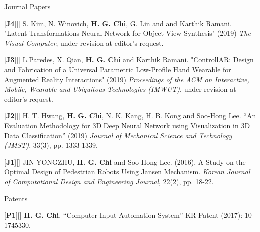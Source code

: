 \begin{cventries}
\cvpub
{Journal Papers} %
{ %
\begin{cvitems}
\item {[\textbf{J4}][\href{https://docs.google.com/viewer?url=https://github.com/stnoah1/CV/raw/master/documents/VisualComputer.pdf}{}] S. Kim, N. Winovich, \textbf{H. G. Chi}, G. Lin and and Karthik Ramani. "Latent Transformations Neural Network for Object View Synthesis" (2019) \textit{The Visual Computer}, under revision at editor's request.}
\item {[\textbf{J3}][\href{https://docs.google.com/viewer?url=https://github.com/stnoah1/CV/raw/master/documents/ControllAR.pdf}{}] L.Paredes, X. Qian, \textbf{H. G. Chi} and Karthik Ramani. "ControllAR: Design and Fabrication of a Universal Parametric Low-Profile Hand Wearable for Augmented Reality Interactions" (2019) \textit{Proceedings of the ACM on Interactive, Mobile, Wearable and Ubiquitous Technologies (IMWUT)}, under revision at editor's request.}
\item {[\textbf{J2}][\href{https://link.springer.com/content/pdf/10.1007/s12206-019-0233-1.pdf}{}] H. T. Hwang, \textbf{H. G. Chi}, N. K. Kang, H. B. Kong and Soo-Hong Lee. “An Evaluation Methodology for 3D Deep Neural Network using Visualization in 3D Data Classification” (2019) \textit{Journal of Mechanical Science and Technology (JMST)}, 33(3), pp. 1333-1339.}
\item {[\textbf{J1}][\href{https://docs.google.com/viewer?url=https://github.com/stnoah1/CV/raw/master/documents/Edison.pdf}{}] JIN YONGZHU, \textbf{H. G. Chi} and Soo-Hong Lee. (2016). A Study on the Optimal Design of Pedestrian Robots Using Jansen Mechanism. \textit{Korean Journal of Computational Design and Engineering Journal}, 22(2), pp. 18-22.}
\end{cvitems}
}
\cvpub
{Patents}{
\begin{cvitems}
\item {[\textbf{P1}][\href{https://docs.google.com/viewer?url=https://github.com/stnoah1/CV/raw/master/documents/patent.pdf}{}] \textbf{H. G. Chi}.  “Computer Input Automation System” KR Patent (2017): 10-1745330.}
\end{cvitems}
}



\end{cventries}